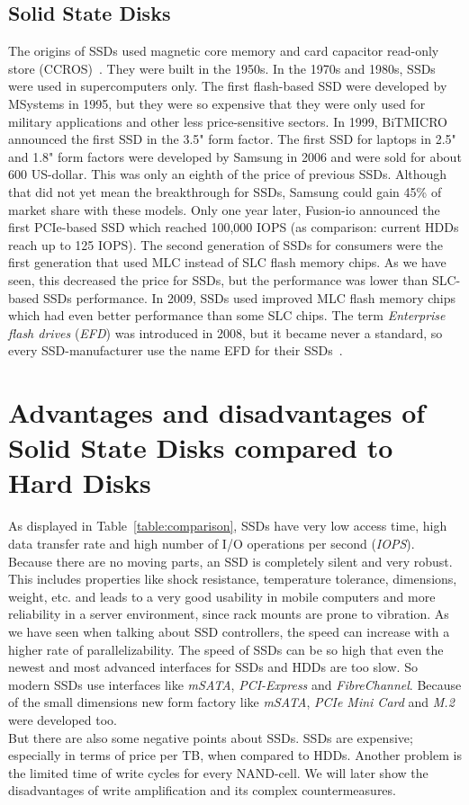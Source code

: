 \documentclass{acm_proc_article-sp}
\begin{document}
\subsection{Solid State Disks}
The origins of SSDs used magnetic core memory and card capacitor read-only store (CCROS)~\cite{originssds}. They were built in the 1950s. In the 1970s and 1980s, SSDs were used in supercomputers only. The first flash-based SSD were developed by MSystems in 1995, but they were so expensive that they were only used for military applications and other less price-sensitive sectors. In 1999, BiTMICRO announced the first SSD in the 3.5" form factor. The first SSD for laptops in 2.5" and 1.8" form factors were developed by Samsung in 2006 and were sold for about 600 US-dollar. This was only an eighth of the price of previous SSDs. Although that did not yet mean the breakthrough for SSDs, Samsung could gain 45\% of market share with these models. Only one year later, Fusion-io announced the first PCIe-based SSD which reached 100,000 IOPS (as comparison: current HDDs reach up to 125 IOPS). The second generation of SSDs for consumers were the first generation that used MLC instead of SLC flash memory chips. As we have seen, this decreased the price for SSDs, but the performance was lower than SLC-based SSDs performance. In 2009, SSDs used improved MLC flash memory chips which had even better performance than some SLC chips. The term \emph{Enterprise flash drives} (\emph{EFD}) was introduced in 2008, but it became never a standard, so every SSD-manufacturer use the name EFD for their SSDs~\cite{efds}.

{
\section{Advantages and disadvantages of Solid State Disks compared to Hard Disks}
}
As displayed in Table~\ref{table:comparison}, SSDs have very low access time, high data transfer rate and high number of I/O operations per second (\emph{IOPS}). Because there are no moving parts, an SSD is completely silent and very robust. This includes properties like shock resistance, temperature tolerance, dimensions, weight, etc. and leads to a very good usability in mobile computers and more reliability in a server environment, since rack mounts are prone to vibration. As we have seen when talking about SSD controllers, the speed can increase with a higher rate of parallelizability. The speed of SSDs can be so high that even the newest and most advanced interfaces for SSDs and HDDs are too slow. So modern SSDs use interfaces like \emph{mSATA}, \emph{PCI-Express} and \emph{FibreChannel}. Because of the small dimensions new form factory like \emph{mSATA}, \emph{PCIe Mini Card} and \emph{M.2} were developed too.
\\
But there are also some negative points about SSDs. SSDs are expensive; especially in terms of price per TB, when compared to HDDs. Another problem is the limited time of write cycles for every NAND-cell. We will later show the disadvantages of write amplification and its complex countermeasures.
\end{document}
